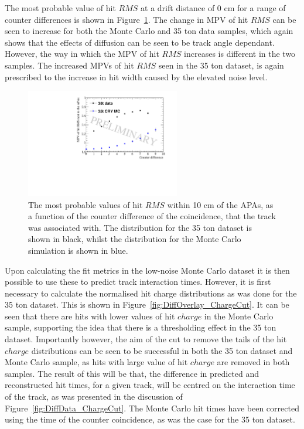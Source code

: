 The most probable value of hit $RMS$ at a drift distance of 0 cm for a range of counter differences is shown in Figure~\ref{fig:DiffMCDataCompInt}. The change in MPV of hit $RMS$ can be seen to increase for both the Monte Carlo and 35 ton data samples, which again shows that the effects of diffusion can be seen to be track angle dependant. However, the way in which the MPV of hit $RMS$ increases is different in the two samples. The increased MPVs of hit $RMS$ seen in the 35 ton dataset, is again prescribed to the increase in hit width caused by the elevated noise level. \\

\begin{figure}[h!]
  \centering
  \includegraphics[width=0.6\textwidth]{InterceptCanvasOverlay}
  \caption[The angular dependence of diffusion in the 35 ton dataset and Monte Carlo for hits within 10 cm of the APAs]
          {The most probable values of hit $RMS$ within 10 cm of the APAs, as a function of the counter difference of the coincidence, that the track was associated with. The distribution for the 35 ton dataset is shown in black, whilst the distribution for the Monte Carlo simulation is shown in blue.}
  \label{fig:DiffMCDataCompInt}
\end{figure}

Upon calculating the fit metrics in the low-noise Monte Carlo dataset it is then possible to use these to predict track interaction times. However, it is first necessary to calculate the normalised hit charge distributions as was done for the 35 ton dataset. This is shown in Figure~\ref{fig:DiffOverlay_ChargeCut}. It can be seen that there are hits with lower values of hit $charge$ in the Monte Carlo sample, supporting the idea that there is a thresholding effect in the 35 ton dataset. Importantly however, the aim of the cut to remove the tails of the hit $charge$ distributions can be seen to be successful in both the 35 ton dataset and Monte Carlo sample, as hits with large value of hit $charge$ are removed in both samples. The result of this will be that, the difference in predicted and reconstructed hit times, for a given track, will be centred on the interaction time of the track, as was presented in the discussion of Figure~\ref{fig:DiffData_ChargeCut}. The Monte Carlo hit times have been corrected using the time of the counter coincidence, as was the case for the 35 ton dataset. \\ 

